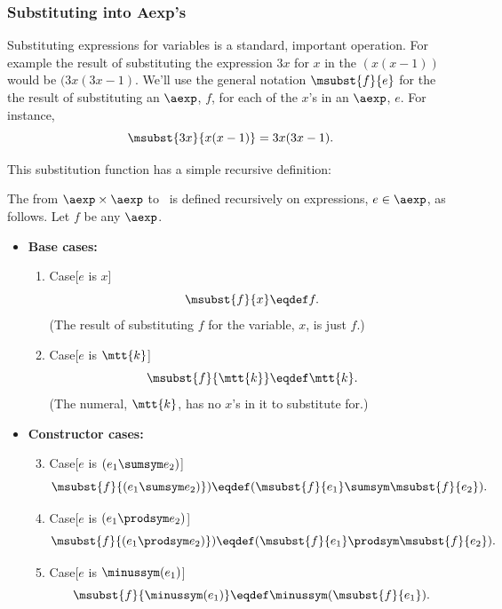 \begin{definition}
\subsubsection{Substituting into Aexp's}
Substituting expressions for variables is a standard, important
operation.  For example the result of substituting the expression $3x$ for $x$
in the $(x(x-1))$ would be $(3x(3x-1)$.  We'll use the general
notation $\msubst{f}{e}$ for the the result of substituting an $\aexp$, $f$,
for each of the $x$'s in an $\aexp$, $e$.  For instance,
\[
\msubst{3x}{x(x-1)} = 3x(3x-1).
\]

This substitution function has a simple recursive definition:

\begin{definition}\label{subst-def}
  The  from $\aexp \times \aexp$ to \aexp\ is
  defined recursively on expressions, $e \in \aexp$, as follows.  Let $f$
  be any $\aexp$.

\begin{itemize}
\item \textbf{Base cases:}

\begin{enumerate}

\item\label{subst-var} Case[$e$ is $x$]
\[
\msubst{f}{x} \eqdef f.
\]
(The result of substituting $f$ for the variable, $x$, is just $f$.)

\item\label{subst-const} Case[$e$ is $\mtt{k}$]
\[
\msubst{f}{\mtt{k}} \eqdef \mtt{k}.
\]
(The numeral, $\mtt{k}$, has no $x$'s in it to substitute for.)

\end{enumerate}

\item \textbf{Constructor cases:}

\begin{enumerate}
\setcounter{enumi}{2}
\item\label{subst-sum} Case[$e$ is $(e_1 \sumsym e_2)$]
\[
\msubst{f}{(e_1 \sumsym e_2)}) \eqdef  (\msubst{f}{e_1} \sumsym
\msubst{f}{e_2}).
\]

\item\label{subst-prod} Case[$e$ is $(e_1 \prodsym e_2)$]
\[
\msubst{f}{(e_1 \prodsym e_2)}) \eqdef  (\msubst{f}{e_1} \prodsym
\msubst{f}{e_2}).
\]

\item\label{subst-minus} Case[$e$ is $\minussym(e_1)$]
\[
\msubst{f}{\minussym(e_1)} \eqdef \minussym (\msubst{f}{e_1}).
\]


\end{enumerate}
\end{itemize}
\end{definition}
\end{definition}

